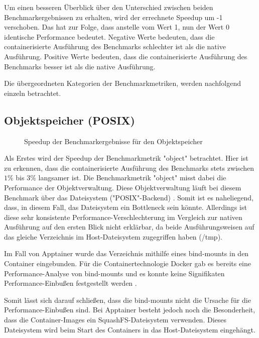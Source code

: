 Um einen besseren Überblick über den Unterschied zwischen beiden Benchmarkergebnissen zu erhalten, wird der errechnete Speedup um -1 verschoben. Das hat zur Folge, dass anstelle vom Wert 1, nun der Wert 0 identische Performance bedeutet. 
Negative Werte bedeuten, dass die containerisierte Ausführung des Benchmarks schlechter ist als die native Ausführung. Positive Werte bedeuten, dass die containerisierte Ausführung des Benchmarks besser ist als die native Ausführung. 

Die übergeordneten Kategorien der Benchmarkmetriken, werden nachfolgend einzeln betrachtet.

\subsection{Objektspeicher (POSIX)} \label{sec:object-speedup}

\begin{figure}[H]
    \centering
    
    \caption{Speedup der Benchmarkergebnisse für den Objektspeicher}
    \label{fig:speedup_object}
\end{figure}

\FloatBarrier

Als Erstes wird der Speedup der Benchmarkmetrik "object" betrachtet. Hier ist zu erkennen, dass die containerisierte Ausführung des Benchmarks stets zwischen $1\%$ bis $3\%$ langsamer ist. Die Benchmarkmetrik "object" misst dabei die Performance der Objektverwaltung. Diese Objektverwaltung läuft bei diesem Benchmark über das Dateisystem ("POSIX"-Backend) \cite[Vgl. S. 719]{kuhnJULEAFlexibleStorage2017}. Somit ist es naheliegend, dass, in diesem Fall, das Dateisystem ein Bottleneck sein könnte. Allerdings ist diese sehr konsistente Performance-Verschlechterung im Vergleich zur nativen Ausführung auf den ersten Blick nicht erklärbar, da beide Ausführungsweisen auf das gleiche Verzeichnis im Host-Dateisystem zugegriffen haben (/tmp). 

Im Fall von Apptainer wurde das Verzeichnis mithilfe eines bind-mounts in den Container eingebunden. Für die Containertechnologie Docker gab es bereits eine Performance-Analyse von bind-mounts und es konnte keine Signifikaten Performance-Einbußen festgestellt werden \cite[Vgl. 4]{dordevicFileSystemPerformance2022}. 

Somit lässt sich darauf schließen, dass die bind-mounts nicht die Ursache für die Performance-Einbußen sind. Bei Apptainer besteht jedoch noch die Besonderheit, dass die Container-Images ein SquashFS-Dateisystem verwenden. Dieses Dateisystem wird beim Start des Containers in das Host-Dateisystem eingehängt. 

